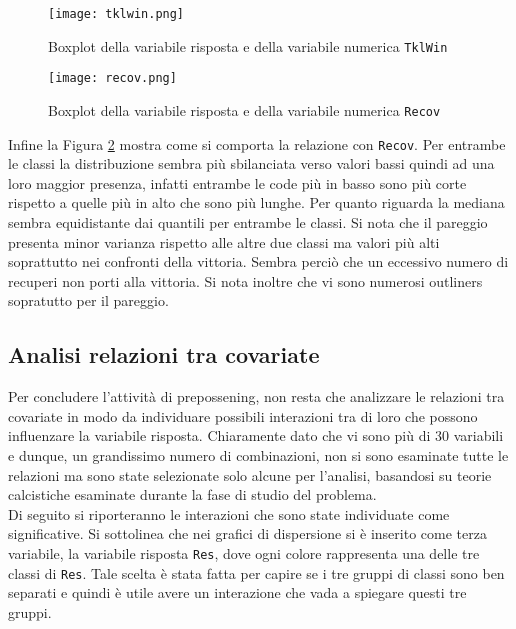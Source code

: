 \begin{figure}[htbp]
	\begin{center}
		\texttt{[image: tklwin.png]}
		\caption{Boxplot della variabile risposta e della variabile numerica \texttt{TklWin}} \label{fig:tkl}
	\end{center}
\end{figure}

\begin{figure}[htbp]
	\begin{center}
		\texttt{[image: recov.png]}
		\caption{Boxplot della variabile risposta e della variabile numerica \texttt{Recov}} \label{fig:recov}
	\end{center}
\end{figure} 

Infine la Figura \ref{fig:recov} mostra come si comporta la relazione con \texttt{Recov}. Per entrambe le classi la distribuzione sembra più sbilanciata verso valori bassi quindi ad una loro maggior presenza, infatti entrambe le code più in basso sono più corte rispetto a quelle più in alto che sono più lunghe. Per quanto riguarda la mediana sembra equidistante dai quantili per entrambe le classi. Si nota che il pareggio presenta minor varianza rispetto alle altre due classi ma valori più alti soprattutto nei confronti della vittoria. Sembra perciò che un eccessivo numero di recuperi non porti alla vittoria. Si nota inoltre che vi sono numerosi outliners sopratutto per il pareggio.

\subsection{Analisi relazioni tra covariate} 
Per concludere l'attività di prepossening, non resta che analizzare le relazioni tra covariate in modo da individuare possibili interazioni tra di loro che possono influenzare la variabile risposta. Chiaramente dato che vi sono più di 30 variabili e dunque, un grandissimo numero di combinazioni, non si sono esaminate tutte le relazioni ma sono state selezionate solo alcune per l'analisi, basandosi su teorie calcistiche esaminate durante la fase di studio del problema.\\
Di seguito si riporteranno le interazioni che sono state individuate come significative. Si sottolinea che nei grafici di dispersione si è inserito come terza variabile, la variabile risposta \texttt{Res}, dove ogni colore rappresenta una delle tre classi di \texttt{Res}. Tale scelta è stata fatta per capire se i tre gruppi di classi sono ben separati e quindi è utile avere un interazione che vada a spiegare questi tre gruppi.\\


